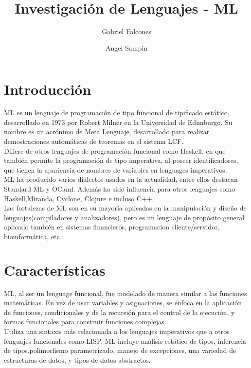 \documentclass[11pt]{article} %
\title{\color{red}Investigación de Lenguajes - ML}
\author{Gabriel Falcones\and Angel Sampin}
\begin{document}
\maketitle


\section{\color{red}Introducción}
ML\nocite{*} es un lenguaje de programación de tipo funcional de tipificado estático, desarrollado en 1973 por Robert Milner en la Universidad de Edimburgo. Su nombre es un acrónimo de Meta Lenguaje, desarrollado para realizar demostraciones automáticas de teoremas en el sistema LCF.\\

Difiere de otros lenguajes de programación funcional como Haskell, en que también permite la programación de tipo imperativa, al poseer identificadores, que tienen la apariencia de nombres de variables en lenguages imperativos.\\

ML ha producido varios dialectos usados en la actualidad, entre ellos destacan Standard ML y OCaml. Además ha sido influencia para otros lenguajes como Haskell,Miranda, Cyclone, Clojure e incluso C++.\\

Las fortalezas de ML son en su mayoría aplicadas en la manipulación y diseño de lenguajes(compiladores y analizadores), pero es un lenguaje de propósito general aplicado también en sistemas financieros, programacion cliente/servidor, bioinformática, etc
  

\section{\color{red}Características}
ML, al ser un lenguage funcional, fue modelado de manera similar a las funciones matemáticas. En vez de usar variables y asignaciones, se enfoca en la aplicación de funciones, condicionales y de la recursión para el control de la ejecución, y formas funcionales para construir funciones complejas.\\
 
Utiliza una sintaxis más relacionada a los lenguajes imperativos que a otros lenguajes funcionales como LISP.
ML incluye análisis estático de tipos, inferencia de tipos,polimorfismo parametrizado, manejo de excepciones, una variedad de estructuras de datos, y tipos de datos abstractos.\\
\end{document}
